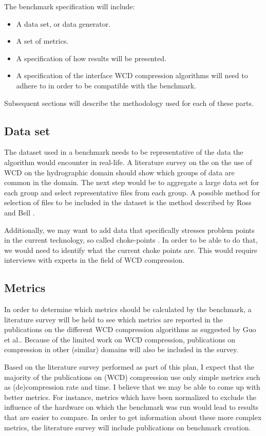 The benchmark specification will include:
\begin{itemize}
\item A data set, or data generator.
\item A set of metrics.
\item A specification of how results will be presented.
\item A specification of the interface WCD compression algorithms will need to adhere to in order to be compatible with the benchmark.
\end{itemize}
Subsequent sections will describe the methodology used for each of these parts.

\subsection{Data set}
The dataset used in a benchmark needs to be representative of the data the algorithm would encounter in real-life. A literature survey on the on the use of WCD on the hydrographic domain should show which groups of data are common in the domain. The next step would be to aggregate a large data set for each group and select representative files from each group. A possible method for selection of files to be included in the dataset is the method described by Ross and Bell \cite{arnold1997corpus}.

Additionally, we may want to add data that specifically stresses problem points in the current technology, so called choke-points \cite{ChokePoint}\cite{capotua2015graphalytics}. In order to be able to do that, we would need to identify what the current choke points are. This would require interviews with experts in the field of WCD compression.

\subsection{Metrics}
In order to determine which metrics should be calculated by the benchmark, a literature survey will be held to see which metrics are reported in the publications on the different WCD compression algorithms as suggested by Guo et al.\cite{guo2014benchmarking}. Because of the limited work on WCD compression, publications on compression in other (similar) domains will also be included in the survey.

Based on the literature survey performed as part of this plan, I expect that the majority of the publications on (WCD) compression use only simple metrics such as (de)compression rate and time. I believe that we may be able to come up with better metrics. For instance, metrics which have been normalized to exclude the influence of the hardware on which the benchmark was run would lead to results that are easier to compare. In order to get information about these more complex metrics, the literature survey will include publications on benchmark creation.

